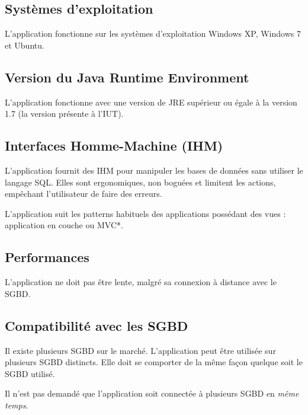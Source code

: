 \subsection{Systèmes d'exploitation}
L'application fonctionne sur les systèmes d'exploitation Windows XP, Windows 7 et Ubuntu.

\subsection{Version du Java Runtime Environment}
L'application fonctionne avec une version de JRE supérieur ou égale à la version 1.7 (la version présente à l'IUT).

\subsection{Interfaces Homme-Machine (IHM)}
L'application fournit des IHM pour manipuler les bases de données sans utiliser le langage SQL.
Elles sont ergonomiques, non boguées et limitent les actions, empêchant l'utilisateur de faire des erreurs.

L'application suit les patterns habituels des applications possédant des vues :
application en couche ou \gls{MVC}*.

\subsection{Performances}
L'application ne doit pas être lente, malgré sa connexion à distance avec le SGBD.

\subsection{Compatibilité avec les SGBD}
Il existe plusieurs SGBD sur le marché.
L'application peut être utilisée sur plusieurs SGBD distincts.
Elle doit se comporter de la même façon quelque soit le SGBD utilisé.

Il n'est pas demandé que l'application soit connectée à plusieurs SGBD en \textit{même temps}.
